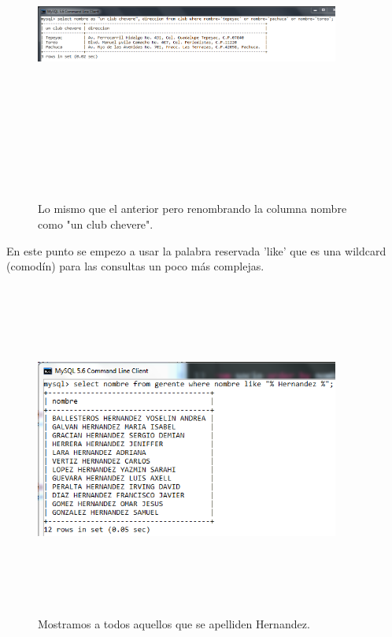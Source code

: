 \documentclass[12pt, titlepage]{article}
\begin{document}
\begin{figure}[H]
    \begin{center}
        \includegraphics[width=10cm, height=11cm]{img/chevere.png}
        \caption{Lo mismo que el anterior pero renombrando la columna nombre como "un club chevere".}
        \label{fig:arlter5}
    \end{center}
\end{figure}
En este punto se empezo a usar la palabra reservada 'like' que es una wildcard (comodín) para las consultas un poco más complejas.
\begin{figure}[H]
    \begin{center}
        \includegraphics[width=10cm, height=11cm]{img/hernandez.png}
        \caption{Mostramos a todos aquellos que se apelliden Hernandez.}
        \label{fig:arlterotro}
    \end{center}
\end{figure}
\end{document}
